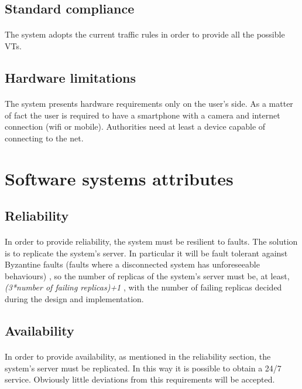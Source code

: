 			\subsection{Standard compliance}
				\paragraph{}
					The system adopts the current traffic rules in order to provide all the possible VTs.
			\subsection{Hardware limitations}
				\paragraph{}
					The system presents hardware requirements only on the user's side. As a matter of fact the user is required to have a smartphone with a camera and internet connection (wifi or mobile). Authorities need at least a device capable of connecting to the net.
		\section{Software systems attributes}
			\subsection{Reliability}
				\paragraph{}
					In order to provide reliability, the system must be resilient to faults. The solution is to replicate the system's server. In particular it will be fault tolerant against Byzantine faults (faults where a disconnected system has unforeseeable
behaviours) , so the number of replicas of the system's server must be, at least, \textit{(3*number of failing replicas)+1} , with the number of failing replicas decided during the design and implementation.
			\subsection{Availability}
				\paragraph{}
					In order to provide availability, as mentioned in the reliability section, the system's server must be replicated. In this way it is possible to obtain a 24/7 service. Obviously little deviations from this requirements will be accepted.
